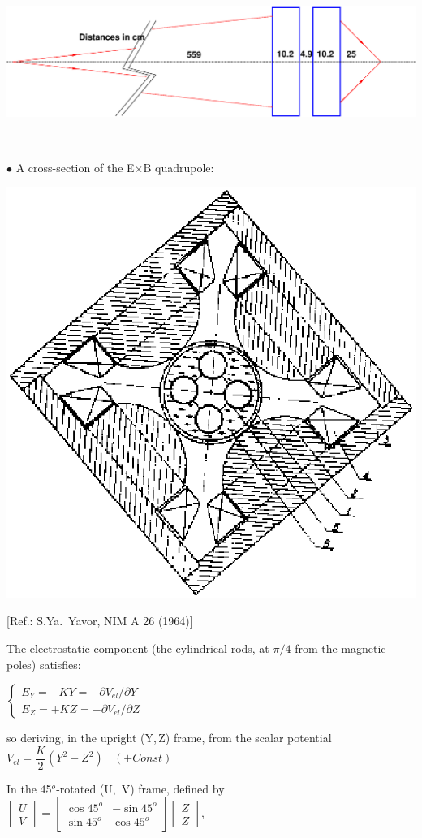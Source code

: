 \documentclass[10pt]{article}
\newcommand{\nin}{\noindent~}
\begin{document}
\begin{minipage}{1.\linewidth}
  \centering
\begin{minipage}{0.55\linewidth}
\hspace{-0.\linewidth}
  \includegraphics[width=1.\linewidth]{achromat.eps}
\end{minipage} 

\vspace{4ex}

\nin
\begin{minipage}{0.45\linewidth}
  
  {\small $\bullet$} A cross-section of the  E$\times$B quadrupole:

    \centering

  \includegraphics[width=0.28\linewidth]{EBQuad.eps}
  
                [Ref.: S.Ya.~Yavor, NIM A 26 (1964)]

  The electrostatic component (the cylindrical rods, at $\pi/4$ from the magnetic poles) satisfies: 
  
$\left\{ \begin{array}{l} E_Y = -KY = -\partial V_{el} /\partial Y \\ E_Z = +KZ = -\partial V_{el} /\partial Z \end{array} \right. $ 

                
\end{minipage} \hfill
\begin{minipage}{0.54\linewidth}
\centering
 so deriving, in the upright (Y,\,Z) frame, from the scalar potential   $V_{el} = \dfrac{K}{2}(Y^2-Z^2) \ \ \ \ (+Const)$

\medskip

In  the 45$^o$-rotated (U,\, V) frame, defined by \\[1ex]
$\left[ \begin{array}{c} U \\ V \end{array}\right]  = \left[ \begin{array}{cc} \cos 45^o & -\sin45^o \\ \sin45^o & \cos45^o\end{array} \right] \left[ \begin{array}{c} Z \\ Z \end{array}\right]$,  


\end{minipage}
\end{minipage}
\end{document}
